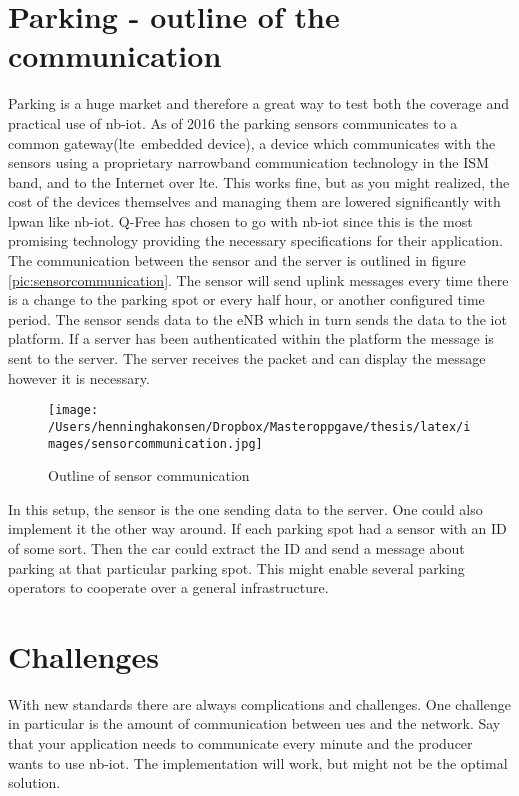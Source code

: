 \documentclass[USenglish]{ifimaster}  %
\begin{document}
\section{Parking - outline of the communication}
Parking is a huge market and therefore a great way to test both the coverage and practical use of \acrshort{nb-iot}. As of 2016 the parking sensors communicates to a common gateway(\acrshort{lte} embedded device), a device which communicates with the sensors using a proprietary narrowband communication technology in the ISM band, and to the Internet over \acrshort{lte}. This works fine, but as you might realized, the cost of the devices themselves and managing them are lowered significantly with \acrshort{lpwan} like \acrshort{nb-iot}. Q-Free has chosen to go with \acrshort{nb-iot} since this is the most promising technology providing the necessary specifications for their application. The communication between the sensor and the server is outlined in figure \vref{pic:sensorcommunication}. The sensor will send uplink messages every time there is a change to the parking spot or every half hour, or another configured time period. The sensor sends data to the eNB which in turn sends the data to the \acrshort{iot} platform. If a server has been authenticated within the platform the message is sent to the server. The server receives the packet and can display the message however it is necessary.

\begin{figure}[ht]
  \centering\texttt{[image: /Users/henninghakonsen/Dropbox/Masteroppgave/thesis/latex/images/sensorcommunication.jpg]}
  \caption{Outline of sensor communication \cite{person:ola}}
  \label{pic:sensorcommunication}
\end{figure}


In this setup, the sensor is the one sending data to the server. One could also implement it the other way around. If each parking spot had a sensor with an ID of some sort. Then the car could extract the ID and send a message about parking at that particular parking spot. This might enable several parking operators to cooperate over a general infrastructure. %

\section{Challenges}
With new standards there are always complications and challenges. One challenge in particular is the amount of communication between \acrshort{ue}s and the network. Say that your application needs to communicate every minute and the producer wants to use \acrshort{nb-iot}. The implementation will work, but might not be the optimal solution.
\end{document}
